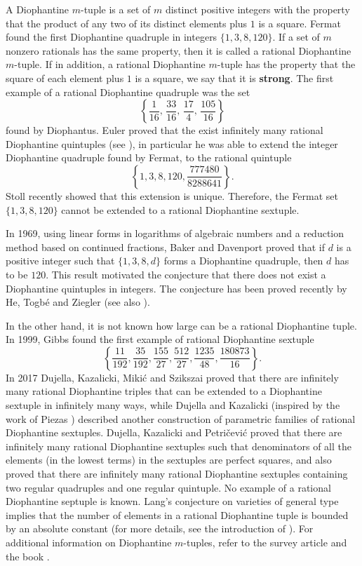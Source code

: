 \documentclass[a4paper]{amsart}
\theoremstyle{plain}
\theoremstyle{definition}
\begin{document}
A Diophantine $m$-tuple is a set of $m$ distinct positive
integers with the property that the product of any two of its distinct
elements plus $1$ is a square. Fermat found the first Diophantine quadruple in integers $\{1,3,8,120\}$.
If a set of $m$ nonzero rationals
has the same property, then it is called
a rational Diophantine $m$-tuple. If in addition, a rational Diophantine $m$-tuple has the property that the square of each element plus $1$ is a square, we say that it is {\bf strong}.
The first example of a rational Diophantine quadruple was the set
$$
\left\{\frac{1}{16},\, \frac{33}{16},\, \frac{17}{4},\, \frac{105}{16}\right\}
$$
found by Diophantus. Euler proved that the exist
infinitely many rational Diophantine quintuples (see \cite{Hea}),
in particular he was able to extend the integer Diophantine quadruple found by Fermat,
to the rational quintuple
$$
\left\{ 1, 3, 8, 120, \frac{777480}{8288641} \right\}.
$$
Stoll \cite{Stoll} recently showed that this extension is unique.
Therefore, the Fermat set $\{1,3,8,120\}$ cannot be extended to a rational Diophantine sextuple.

In 1969, using linear forms in logarithms of algebraic numbers and a reduction method
based on continued fractions, Baker and Davenport \cite{B-D}
proved that if $d$ is a positive integer such that
$\{1, 3, 8, d\}$ forms a Diophantine quadruple, then $d$ has to be $120$.
This result motivated the conjecture that there does not exist a Diophantine quintuples in integers.
The conjecture has been proved recently by He, Togb\'e and Ziegler \cite{HTZ}
(see also \cite{duje-crelle}).

In the other hand, it is not known how large can be a rational Diophantine tuple.
In 1999, Gibbs found the first example of rational Diophantine sextuple \cite{Gibbs1}
$$
\left\{ \frac{11}{192}, \frac{35}{192}, \frac{155}{27}, \frac{512}{27}, \frac{1235}{48}, \frac{180873}{16} \right\}.
$$
In 2017 Dujella, Kazalicki, Miki\'c and Szikszai \cite{DKMS} proved that there are
infinitely many rational Diophantine triples that can be extended to a Diophantine sextuple in infinitely many ways, while
Dujella and Kazalicki \cite{Duje-Matija} (inspired by the work of Piezas \cite{P})
described another construction of parametric families of rational Diophantine sextuples.
Dujella, Kazalicki and Petri\v{c}evi\'c \cite{DKP-sext}
proved that there are infinitely many rational Diophantine sextuples
such that denominators of all the elements (in the lowest terms) in the sextuples are perfect squares, and also proved \cite{DKP-reg} that there are infinitely many rational Diophantine sextuples containing two regular quadruples and one regular quintuple.
No example of a rational Diophantine septuple is known.
Lang's conjecture on varieties of general type implies that
the number of elements in a rational Diophantine tuple is bounded by an absolute constant
(for more details, see the introduction of \cite{DKMS}).
For additional information on Diophantine $m$-tuples, refer to the survey article \cite{Duje-notices} and the book \cite{duje-book}.
\end{document}
